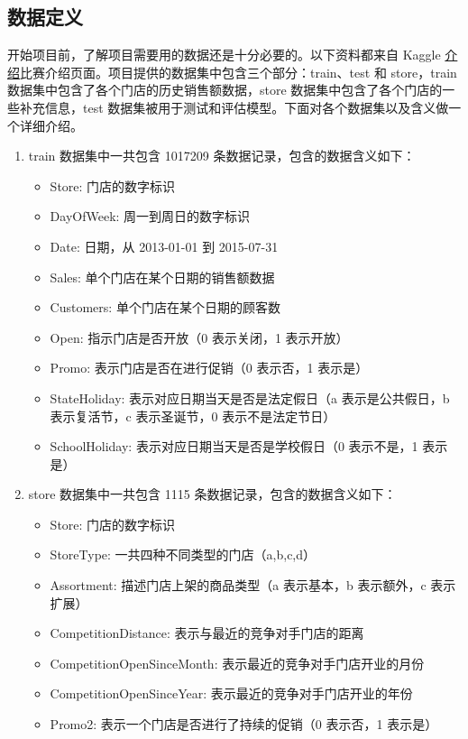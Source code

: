 \documentclass[a4paper]{article}
\begin{document}
\subsection{数据定义}
开始项目前，了解项目需要用的数据还是十分必要的。以下资料都来自 Kaggle \href{https://www.kaggle.com/c/rossmann-store-sales/data}{介绍}比赛介绍页面。项目提供的数据集中包含三个部分：train、test 和 store，train 数据集中包含了各个门店的历史销售额数据，store 数据集中包含了各个门店的一些补充信息，test 数据集被用于测试和评估模型。下面对各个数据集以及含义做一个详细介绍。
\begin{enumerate}
    \item train 数据集中一共包含 1017209 条数据记录，包含的数据含义如下：
    \begin{itemize}
        \item Store: 门店的数字标识
        \item DayOfWeek: 周一到周日的数字标识
        \item Date: 日期，从 2013-01-01 到 2015-07-31
        \item Sales: 单个门店在某个日期的销售额数据
        \item Customers: 单个门店在某个日期的顾客数
        \item Open: 指示门店是否开放（0 表示关闭，1 表示开放）
        \item Promo: 表示门店是否在进行促销（0 表示否，1 表示是）
        \item StateHoliday: 表示对应日期当天是否是法定假日（a 表示是公共假日，b 表示复活节，c 表示圣诞节，0 表示不是法定节日）
        \item SchoolHoliday: 表示对应日期当天是否是学校假日（0 表示不是，1 表示是）
    \end{itemize}
    \item store 数据集中一共包含 1115 条数据记录，包含的数据含义如下：
    \begin{itemize}
        \item Store: 门店的数字标识
        \item StoreType: 一共四种不同类型的门店（a,b,c,d）
        \item Assortment: 描述门店上架的商品类型（a 表示基本，b 表示额外，c 表示扩展）
        \item CompetitionDistance: 表示与最近的竞争对手门店的距离
        \item CompetitionOpenSinceMonth: 表示最近的竞争对手门店开业的月份
        \item CompetitionOpenSinceYear: 表示最近的竞争对手门店开业的年份
        \item Promo2: 表示一个门店是否进行了持续的促销（0 表示否，1 表示是）

\end{itemize}
\end{enumerate}
\end{document}
